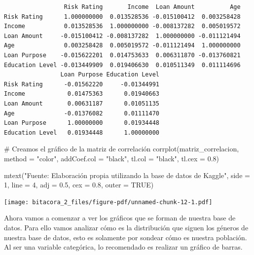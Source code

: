 \documentclass[
  letterpaper,
  DIV=11,
  numbers=noendperiod]{scrreprt}
\newenvironment{Shaded}{\begin{snugshade}}{\end{snugshade}}
\newcommand{\AttributeTok}[1]{\textcolor[rgb]{0.40,0.45,0.13}{#1}}
\newcommand{\CommentTok}[1]{\textcolor[rgb]{0.37,0.37,0.37}{#1}}
\newcommand{\ConstantTok}[1]{\textcolor[rgb]{0.56,0.35,0.01}{#1}}
\newcommand{\DecValTok}[1]{\textcolor[rgb]{0.68,0.00,0.00}{#1}}
\newcommand{\FloatTok}[1]{\textcolor[rgb]{0.68,0.00,0.00}{#1}}
\newcommand{\FunctionTok}[1]{\textcolor[rgb]{0.28,0.35,0.67}{#1}}
\newcommand{\NormalTok}[1]{\textcolor[rgb]{0.00,0.23,0.31}{#1}}
\newcommand{\StringTok}[1]{\textcolor[rgb]{0.13,0.47,0.30}{#1}}
\begin{document}
\begin{verbatim}
                 Risk Rating       Income  Loan Amount          Age
Risk Rating      1.000000000  0.013528536 -0.015100412  0.003258428
Income           0.013528536  1.000000000 -0.008137282  0.005019572
Loan Amount     -0.015100412 -0.008137282  1.000000000 -0.011121494
Age              0.003258428  0.005019572 -0.011121494  1.000000000
Loan Purpose    -0.015622201  0.014753633  0.006311870 -0.013760821
Education Level -0.013449909  0.019406630  0.010511349  0.011114696
                Loan Purpose Education Level
Risk Rating      -0.01562220     -0.01344991
Income            0.01475363      0.01940663
Loan Amount       0.00631187      0.01051135
Age              -0.01376082      0.01111470
Loan Purpose      1.00000000      0.01934448
Education Level   0.01934448      1.00000000
\end{verbatim}

\begin{Shaded}
\begin{Highlighting}[]
\CommentTok{\# Creamos el gráfico de la matriz de correlación}
\FunctionTok{corrplot}\NormalTok{(matriz\_correlacion, }\AttributeTok{method =} \StringTok{"color"}\NormalTok{, }\AttributeTok{addCoef.col =} \StringTok{"black"}\NormalTok{, }\AttributeTok{tl.col =} \StringTok{"black"}\NormalTok{, }\AttributeTok{tl.cex =} \FloatTok{0.8}\NormalTok{)}

\FunctionTok{mtext}\NormalTok{(}\StringTok{"Fuente: Elaboración propia utilizando la base de datos de Kaggle"}\NormalTok{, }\AttributeTok{side =} \DecValTok{1}\NormalTok{, }\AttributeTok{line =} \DecValTok{4}\NormalTok{, }\AttributeTok{adj =} \FloatTok{0.5}\NormalTok{, }\AttributeTok{cex =} \FloatTok{0.8}\NormalTok{, }\AttributeTok{outer =} \ConstantTok{TRUE}\NormalTok{)}
\end{Highlighting}
\end{Shaded}

\texttt{[image: bitacora\_2\_files/figure-pdf/unnamed-chunk-12-1.pdf]}

Ahora vamos a comenzar a ver los gráficos que se forman de nuestra base
de datos. Para ello vamos analizar cómo es la distribución que siguen
los géneros de nuestra base de datos, esto es solamente por sondear cómo
es nuestra población. Al ser una variable categórica, lo recomendado es
realizar un gráfico de barras.
\end{document}
